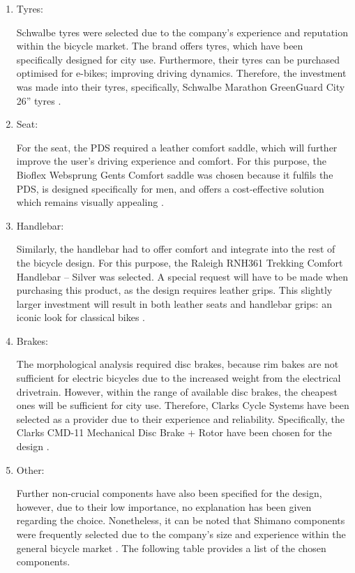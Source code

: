 \documentclass[a4paper,11pt]{article}
\begin{document}
\begin{enumerate}[leftmargin=0pt, itemindent=20pt,labelwidth=15pt, labelsep=5pt, listparindent=0.7cm,align=left]
	\item Tyres:
		
		Schwalbe tyres were selected due to the company's experience and reputation within the bicycle market. The brand offers tyres, which have been specifically designed for city use. Furthermore, their tyres can be purchased optimised for e-bikes; improving driving dynamics. Therefore, the investment was made into their tyres, specifically, Schwalbe Marathon GreenGuard City 26'' tyres \cite{schwalbe18}. 

	\item Seat:

		For the seat, the PDS required a leather comfort saddle, which will further improve the user's driving experience and comfort. For this purpose, the Bioflex Websprung Gents Comfort saddle was chosen because it fulfils the PDS, is designed specifically for men, and offers a cost-effective solution which remains visually appealing \cite{bioflex18}. 

	\item Handlebar:

		Similarly, the handlebar had to offer comfort and integrate into the rest of the bicycle design. For this purpose, the Raleigh RNH361 Trekking Comfort Handlebar -- Silver was selected. A special request will have to be made when purchasing this product, as the design requires leather grips. This slightly larger investment will result in both leather seats and handlebar grips: an iconic look for classical bikes \cite{raleigh18}. 

	\item Brakes:

		The morphological analysis required disc brakes, because rim bakes are not sufficient for electric bicycles due to the increased weight from the electrical drivetrain. However, within the range of available disc brakes, the cheapest ones will be sufficient for city use. Therefore, Clarks Cycle Systems have been selected as a provider due to their experience and reliability. Specifically, the Clarks CMD-11 Mechanical Disc Brake + Rotor have been chosen for the design \cite{clarks18}. 

	\item Other:

		Further non-crucial components have also been specified for the design, however, due to their low importance, no explanation has been given regarding the choice. Nonetheless, it can be noted that Shimano components were frequently selected due to the company's size and experience within the general bicycle market \cite{shimano18}. The following table provides a list of the chosen components.
\end{enumerate}
\end{document}
